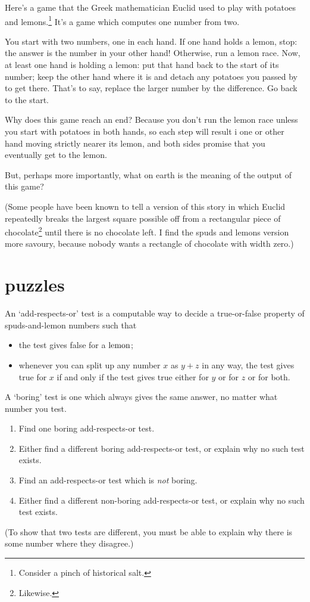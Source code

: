 \documentclass{book}
\begin{document}
Here's a game that the Greek mathematician Euclid used to play with potatoes and lemons.\footnote{Consider a pinch of historical salt.} It's a game which computes one number from two.

You start with two numbers, one in each hand. If one hand holds a lemon, stop: the answer is the number in your other hand! Otherwise, run a lemon race. Now, at least one hand is holding a lemon: put that hand back to the start of its number; keep the other hand where it is and detach any potatoes you passed by to get there. That's to say, replace the larger number by the difference. Go back to the start.

Why does this game reach an end? Because you don't run the lemon race unless you start with potatoes in both hands, so each step will result i one or other hand moving strictly nearer its lemon, and both sides promise that you eventually get to the lemon.

But, perhaps more importantly, what on earth is the meaning of the output of this game?

(Some people have been known to tell a version of this story in which Euclid repeatedly breaks the largest square possible off from a rectangular piece of chocolate\footnote{Likewise.} until there is no chocolate left. I find the spuds and lemons version more savoury, because nobody wants a rectangle of chocolate with width zero.)


\section{puzzles}

\begin{puz}
  An `add-respects-or' test is a computable way to decide a true-or-false property of spuds-and-lemon numbers such that
  \begin{itemize}
  \item the test gives false for a $\mbox{lemon}$;
    \item whenever you can split up any number $x$ as $y+z$ in any way, the test gives true for $x$ if and only if the test gives true either for $y$ or for $z$ or for both.
  \end{itemize}
  A `boring' test is one which always gives the same answer, no matter what number you test.
  \begin{enumerate}
  \item Find one boring add-respects-or test.
  \item Either find a different boring add-respects-or test, or explain why no such test exists.
  \item Find an add-respects-or test which is \emph{not} boring.
  \item Either find a different non-boring add-respects-or test, or explain why no such test exists.
  \end{enumerate}
(To show that two tests are different, you must be able to explain why there is some number where they disagree.)
\end{puz}
\end{document}
